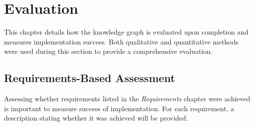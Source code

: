 \chapter{Evaluation}
This chapter details how the knowledge graph is evaluated upon completion and measures implementation success. Both qualitative and quantitative methods were used during this section to provide a comprehensive evaluation.

\section{Requirements-Based Assessment}
\hspace{0.5cm} Assessing whether requirements listed in the \textit{Requirements} chapter were achieved is important to measure success of implementation. For each requirement, a description stating whether it was achieved will be provided. 

